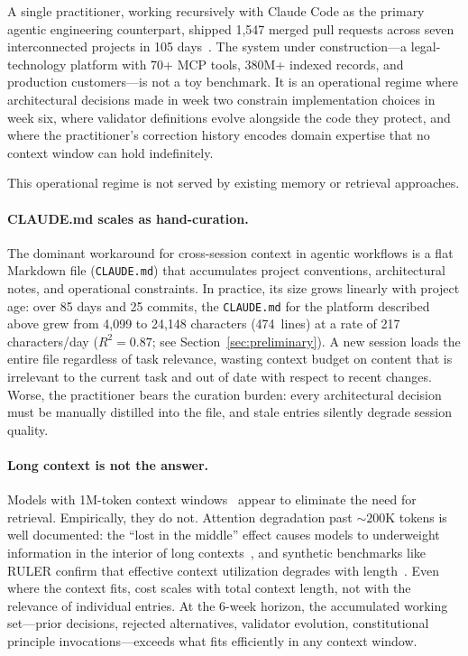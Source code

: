 \documentclass[11pt]{article}
\begin{document}
A single practitioner, working recursively with Claude Code as the primary agentic engineering counterpart, shipped 1{,}547 merged pull requests across seven interconnected projects in 105 days~\citep[\S1]{ovcharov2026recursive}.
The system under construction---a legal-technology platform with 70+ MCP tools, 380M+ indexed records, and production customers---is not a toy benchmark.
It is an operational regime where architectural decisions made in week two constrain implementation choices in week six, where validator definitions evolve alongside the code they protect, and where the practitioner's correction history encodes domain expertise that no context window can hold indefinitely.

This operational regime is not served by existing memory or retrieval approaches.

\paragraph{CLAUDE.md scales as hand-curation.}
The dominant workaround for cross-session context in agentic workflows is a flat Markdown file (\texttt{CLAUDE.md}) that accumulates project conventions, architectural notes, and operational constraints.
In practice, its size grows linearly with project age: over 85 days and 25 commits, the \texttt{CLAUDE.md} for the platform described above grew from 4{,}099 to 24{,}148 characters (474~lines) at a rate of 217 characters/day ($R^2 = 0.87$; see Section~\ref{sec:preliminary}).
A new session loads the entire file regardless of task relevance, wasting context budget on content that is irrelevant to the current task and out of date with respect to recent changes.
Worse, the practitioner bears the curation burden: every architectural decision must be manually distilled into the file, and stale entries silently degrade session quality.

\paragraph{Long context is not the answer.}
Models with 1M-token context windows~\citep{reid2024gemini} appear to eliminate the need for retrieval.
Empirically, they do not.
Attention degradation past ${\sim}200$K tokens is well documented: the ``lost in the middle'' effect causes models to underweight information in the interior of long contexts~\citep{liu2023lost}, and synthetic benchmarks like RULER confirm that effective context utilization degrades with length~\citep{hsieh2024ruler}.
Even where the context fits, cost scales with total context length, not with the relevance of individual entries.
At the 6-week horizon, the accumulated working set---prior decisions, rejected alternatives, validator evolution, constitutional principle invocations---exceeds what fits efficiently in any context window.
\end{document}
